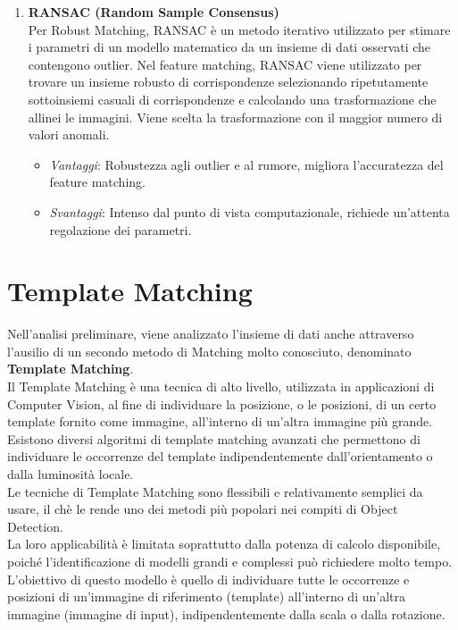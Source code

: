 \documentclass[12pt,a4paper,openright,twoside]{book}
\begin{document}
\begin{enumerate}
\item \textbf{RANSAC (Random Sample Consensus)}\\
Per Robust Matching, RANSAC è un metodo iterativo utilizzato per stimare i parametri di un modello matematico da un insieme di dati osservati che contengono outlier. Nel feature matching, RANSAC viene utilizzato per trovare un insieme robusto di corrispondenze selezionando ripetutamente sottoinsiemi casuali di corrispondenze e calcolando una trasformazione che allinei le immagini. Viene scelta la trasformazione con il maggior numero di valori anomali.
\begin{itemize}
\item {\itshape Vantaggi}: Robustezza agli outlier e al rumore, migliora l'accuratezza del feature matching.
\item {\itshape Svantaggi}:  Intenso dal punto di vista computazionale, richiede un'attenta regolazione dei parametri.
\end{itemize}

\end{enumerate}

\section{Template Matching}
Nell'analisi preliminare, viene analizzato l'insieme di dati anche attraverso l'ausilio di un secondo metodo di Matching molto conosciuto, denominato \textbf{Template Matching}.\\
Il Template Matching è una tecnica di alto livello, utilizzata in applicazioni di Computer Vision, al fine di individuare la posizione, o le posizioni, di un certo template fornito come immagine, all'interno di un'altra immagine più grande.\\
Esistono diversi algoritmi di template matching avanzati che permettono di individuare le occorrenze del template indipendentemente dall'orientamento o dalla luminosità locale.\\
Le tecniche di Template Matching sono flessibili e relativamente semplici da usare, il chè le rende uno dei metodi più popolari nei compiti di Object Detection.\\
La loro applicabilità è limitata soprattutto dalla potenza di calcolo disponibile, poiché l'identificazione di modelli grandi e complessi può richiedere molto tempo.\\

L'obiettivo di questo modello è quello di individuare tutte le occorrenze e posizioni di un'immagine di riferimento (template) all'interno di un'altra immagine (immagine di input), indipendentemente dalla scala o dalla rotazione.\\
\end{document}
